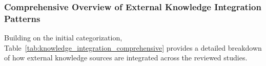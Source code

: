 



\subsubsection{Comprehensive Overview of External Knowledge Integration Patterns}

Building on the initial categorization, Table~\ref{tab:knowledge_integration_comprehensive} provides a detailed breakdown of how external knowledge sources are integrated across the reviewed studies.

